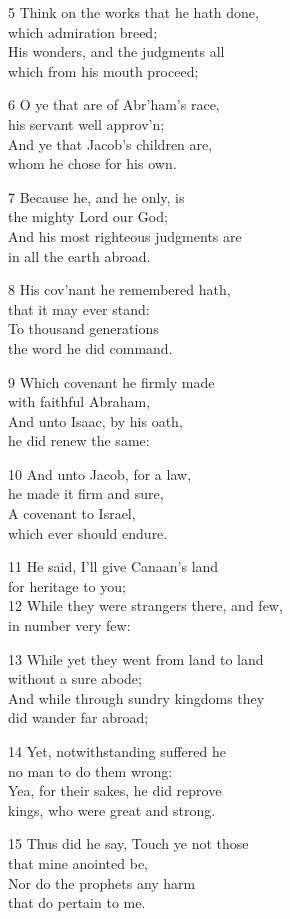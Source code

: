5 Think on the works that he hath done,\\
which admiration breed;\\
His wonders, and the judgments all\\
which from his mouth proceed;

6 O ye that are of Abr’ham’s race,\\
his servant well approv’n;\\
And ye that Jacob’s children are,\\
whom he chose for his own.

7 Because he, and he only, is\\
the mighty Lord our God;\\
And his most righteous judgments are\\
in all the earth abroad.

8 His cov’nant he remembered hath,\\
that it may ever stand:\\
To thousand generations\\
the word he did command.

9 Which covenant he firmly made\\
with faithful Abraham,\\
And unto Isaac, by his oath,\\
he did renew the same:

10 And unto Jacob, for a law,\\
he made it firm and sure,\\
A covenant to Israel,\\
which ever should endure.

11 He said, I’ll give Canaan’s land\\
for heritage to you;\\
12 While they were strangers there, and few,\\
in number very few:

13 While yet they went from land to land\\
without a sure abode;\\
And while through sundry kingdoms they\\
did wander far abroad;

14 Yet, notwithstanding suffered he\\
no man to do them wrong:\\
Yea, for their sakes, he did reprove\\
kings, who were great and strong.

15 Thus did he say, Touch ye not those\\
that mine anointed be,\\
Nor do the prophets any harm\\
that do pertain to me.

